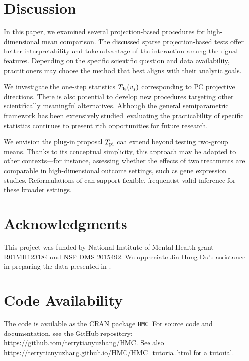 \documentclass[11pt]{article}
\begin{document}
\section{Discussion}
\label{section: discussion}
In this paper, we examined several projection-based procedures for high-dimensional mean comparison. The discussed sparse projection-based tests offer better interpretability and take advantage of the interaction among the signal features. Depending on the specific scientific question and data availability, practitioners may choose the method that best aligns with their analytic goals.

We investigate the one-step statistics $T_{\rm 1s}(v_j)$ corresponding to PC projective directions. There is also potential to develop new procedures targeting other scientifically meaningful alternatives. Although the general semiparametric framework has been extensively studied, evaluating the practicability of specific statistics continues to present rich opportunities for future research.

We envision the plug-in proposal $T_{\rm pi}$ can extend beyond testing two-group means.
Thanks to its conceptual simplicity, this approach may be adapted to other contexts---for instance, assessing whether the effects of two treatments are comparable in high-dimensional outcome settings, such as gene expression studies. Reformulations of  can support flexible, frequentist-valid inference for these broader settings.

\section*{Acknowledgments}
 This project was funded by National Institute of Mental Health grant R01MH123184 and NSF DMS-2015492. We appreciate Jin-Hong Du's assistance in preparing the data presented in .

\section*{Code Availability}
The code is available as the CRAN package \texttt{HMC}. For source code and documentation, see the GitHub repository:
\url{https://github.com/terrytianyuzhang/HMC}. See also \url{https://terrytianyuzhang.github.io/HMC/HMC_tutorial.html} for a tutorial.




\end{document}
